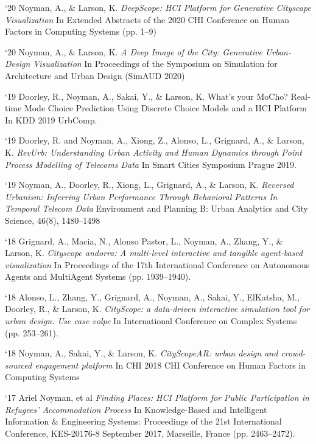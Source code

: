 \begin{tablist}
    \item[`20] \tab  Noyman, A., \& Larson, K.
    \textit{DeepScope: HCI Platform for Generative Cityscape Visualization
    }
    In Extended Abstracts of the 2020 CHI Conference on Human Factors in Computing Systems (pp. 1–9)

    \item[`20] \tab  Noyman, A., \& Larson, K.
    \textit{A Deep Image of the City: Generative Urban-Design Visualization
    }
    In Proceedings of the Symposium on Simulation for Architecture and Urban Design (SimAUD 2020)


    \item[`19] \tab  Doorley, R., Noyman, A., Sakai, Y., \& Larson, K.
    What’s your MoCho? Real-time Mode Choice Prediction Using Discrete Choice Models and a HCI Platform
    In KDD 2019 UrbComp.

    \item[`19] \tab  Doorley, R. and Noyman, A., Xiong, Z., Alonso, L., Grignard, A., \& Larson, K.
    \textit{RevUrb: Understanding Urban Activity and Human Dynamics through Point Process Modelling of Telecoms Data}
    In Smart Cities Symposium Prague 2019.

    \item[`19] \tab  Noyman, A., Doorley, R., Xiong, L., Grignard, A., \& Larson, K.
    \textit{Reversed Urbanism: Inferring Urban Performance Through Behavioral Patterns In Temporal Telecom Data}
    Environment and Planning B: Urban Analytics and City Science, 46(8), 1480–1498

    \item[`18] \tab  Grignard, A., Macia, N., Alonso Pastor, L., Noyman, A., Zhang, Y., \& Larson, K.
    \textit{Cityscope andorra: A multi-level interactive and tangible agent-based visualization}
    In Proceedings of the 17th International Conference on Autonomous Agents and MultiAgent Systems (pp. 1939–1940).

    \item[`18] \tab  Alonso, L., Zhang, Y., Grignard, A., Noyman, A., Sakai, Y., ElKatsha, M., Doorley, R., \& Larson, K.
    \textit{CityScope: a data-driven interactive simulation tool for urban design. Use case volpe}
    In International Conference on Complex Systems (pp. 253–261).

    \item[`18] \tab  Noyman, A., Sakai, Y., \& Larson, K.
    \textit{CityScopeAR: urban design and crowd-sourced engagement platform
    }In CHI 2018 CHI Conference on Human Factors in Computing Systems
    \item[`17] \tab  Ariel Noyman, et al
    \textit{Finding Places: HCI Platform for Public Participation in Refugees’ Accommodation Process}
    In Knowledge-Based and Intelligent Information \& Engineering Systems: Proceedings of the 21st International Conference, KES-20176-8 September 2017, Marseille, France (pp. 2463–2472).


\end{tablist}
